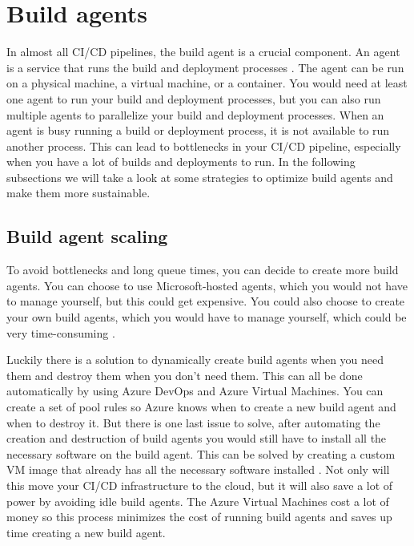 \section{Build agents}
In almost all CI/CD pipelines, the build agent is a crucial component. An agent is a service that runs the build and deployment processes \autocite{packtpub}.
The agent can be run on a physical machine, a virtual machine, or a container. 
You would need at least one agent to run your build and deployment processes, but you can also run multiple agents to parallelize your build and deployment processes.
When an agent is busy running a build or deployment process, it is not available to run another process.
This can lead to bottlenecks in your CI/CD pipeline, especially when you have a lot of builds and deployments to run.
In the following subsections we will take a look at some strategies to optimize build agents and make them more sustainable.

\subsection{Build agent scaling}
To avoid bottlenecks and long queue times, you can decide to create more build agents.
You can choose to use Microsoft-hosted agents, which you would not have to manage yourself, but this could get expensive.
You could also choose to create your own build agents, which you would have to manage yourself, which could be very time-consuming \autocite{hexmaster}.

Luckily there is a solution to dynamically create build agents when you need them and destroy them when you don't need them.
This can all be done automatically by using Azure DevOps and Azure Virtual Machines. You can create a set of pool rules so Azure knows when to create a new build agent and when to destroy it.
But there is one last issue to solve, after automating the creation and destruction of build agents you would still have to install all the necessary software on the build agent.
This can be solved by creating a custom VM image that already has all the necessary software installed \autocite{hexmaster}.
Not only will this move your CI/CD infrastructure to the cloud, but it will also save a lot of power by avoiding idle build agents.
The Azure Virtual Machines cost a lot of money so this process minimizes the cost of running build agents and saves up time creating a new build agent.

